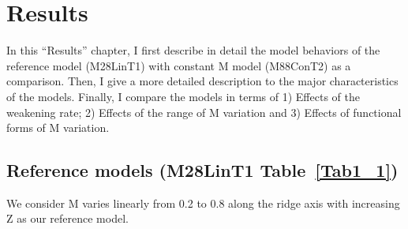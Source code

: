 \pagebreak
\section{Results}
In this ``Results'' chapter, I first describe in detail the model behaviors of the reference model (M28LinT1) with constant M model (M88ConT2) as a comparison. Then, I give a more detailed description to the major characteristics of the models. Finally, I compare the  models in terms of 1) Effects of the weakening rate; 2) Effects of the range of M variation and 3) Effects of functional forms of M variation.

\subsection{Reference models (M28LinT1 Table~\hyperref[Tab1_1]{\ref{Tab1_1}})}\label{sec_M28LinT1}

We consider M varies linearly from 0.2 to 0.8 along the ridge axis with increasing Z as our reference model.

